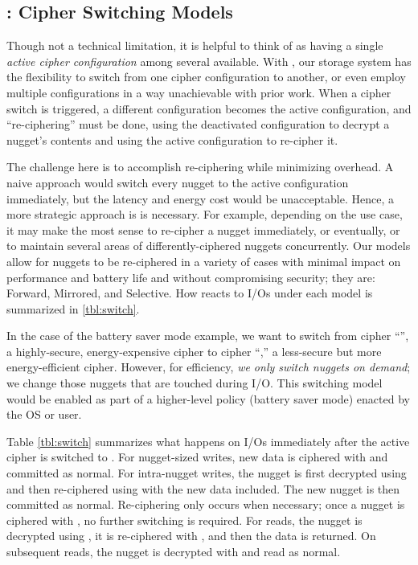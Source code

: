 \subsection{\sysA: Cipher Switching Models}\label{subsec:des-switch}

Though not a technical limitation, it is helpful to think of \sys as having a
single {\em active cipher configuration} among several available. With \sysA,
our storage system has the flexibility to switch from one cipher configuration
to another, or even employ multiple configurations in a way unachievable with
prior work. When a cipher switch is triggered, a different configuration becomes
the active configuration, and ``re-ciphering'' must be done, \ie using the
deactivated configuration to decrypt a nugget's contents and using the active
configuration to re-cipher it.

The challenge here is to accomplish re-ciphering while minimizing overhead. A
naive approach would switch every nugget to the active configuration
immediately, but the latency and energy cost would be unacceptable. Hence, a
more strategic approach is is necessary. For example, depending on the use case,
it may make the most sense to re-cipher a nugget immediately, or eventually, or
to maintain several areas of differently-ciphered nuggets concurrently. Our
models allow for nuggets to be re-ciphered in a variety of cases with minimal
impact on performance and battery life and without compromising security; they
are: Forward, Mirrored, and Selective. How \sys reacts to I/Os under each model
is summarized in \cref{tbl:switch}.




 In the case of the battery saver mode
example, we want to switch from cipher ``\cone'', a highly-secure,
energy-expensive cipher to cipher ``\ctwo,'' a less-secure but more
energy-efficient cipher. However, for efficiency, {\em we only switch
nuggets on demand}; \ie we change those nuggets that are touched
during I/O. This switching model would be enabled as part of a
higher-level policy (\ie battery saver mode) enacted by the OS or
user.

Table \cref{tbl:switch} summarizes what happens on I/Os immediately after the
active cipher is switched to \ctwo. For nugget-sized writes, new data is
ciphered with \ctwo and committed as normal. For intra-nugget writes, the nugget
is first decrypted using \cone and then re-ciphered using \ctwo with the new
data included. The new nugget is then committed as normal. Re-ciphering only
occurs when necessary; once a nugget is ciphered with \ctwo, no further
switching is required. For reads, the nugget is decrypted using \cone, it is
re-ciphered with \ctwo, and then the data is returned. On subsequent reads, the
nugget is decrypted with \ctwo and read as normal.

